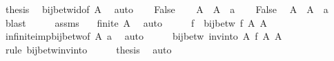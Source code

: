 \begin{isabellebody}
\ {\isacharquery}{\kern0pt}thesis\ \isamarkupfalse%
\ bij{\isacharunderscore}{\kern0pt}betw{\isacharunderscore}{\kern0pt}id{\isacharbrackleft}{\kern0pt}of\ A{\isacharbrackright}{\kern0pt}\ \isamarkupfalse%
\ auto\isanewline
{}\isamarkupfalse%
\isanewline
\ \ \isamarkupfalse%
\ False\isanewline
\ \ \isamarkupfalse%
\ {\isacharquery}{\kern0pt}A{\isacharprime}{\kern0pt}\ {\isacharequal}{\kern0pt}\ {\isachardoublequoteopen}A\ {\isasymunion}\ {\isacharbraceleft}{\kern0pt}a{\isacharbraceright}{\kern0pt}{\isachardoublequoteclose}\isanewline
\ \ \isamarkupfalse%
\ False\ \isamarkupfalse%
\ {\isachardoublequoteopen}A\ {\isacharequal}{\kern0pt}\ {\isacharquery}{\kern0pt}A{\isacharprime}{\kern0pt}\ {\isacharminus}{\kern0pt}\ {\isacharbraceleft}{\kern0pt}a{\isacharbraceright}{\kern0pt}{\isachardoublequoteclose}\ \isamarkupfalse%
\ blast\isanewline
\ \ \isamarkupfalse%
\ \isamarkupfalse%
\ assms\ \isamarkupfalse%
\ {\isachardoublequoteopen}{\isasymnot}\ finite\ {\isacharquery}{\kern0pt}A{\isacharprime}{\kern0pt}{\isachardoublequoteclose}\ \isamarkupfalse%
\ auto\isanewline
\ \ \isamarkupfalse%
\ \isamarkupfalse%
\ f\ \ {\isachardoublequoteopen}bij{\isacharunderscore}{\kern0pt}betw\ f\ {\isacharquery}{\kern0pt}A{\isacharprime}{\kern0pt}\ A{\isachardoublequoteclose}\isanewline
\ \ \ \ \isamarkupfalse%
\ infinite{\isacharunderscore}{\kern0pt}imp{\isacharunderscore}{\kern0pt}bij{\isacharunderscore}{\kern0pt}betw{\isacharbrackleft}{\kern0pt}of\ {\isacharquery}{\kern0pt}A{\isacharprime}{\kern0pt}\ a{\isacharbrackright}{\kern0pt}\ \isamarkupfalse%
\ auto\isanewline
\ \ \isamarkupfalse%
\ \isamarkupfalse%
\ {\isachardoublequoteopen}bij{\isacharunderscore}{\kern0pt}betw\ {\isacharparenleft}{\kern0pt}inv{\isacharunderscore}{\kern0pt}into\ {\isacharquery}{\kern0pt}A{\isacharprime}{\kern0pt}\ f{\isacharparenright}{\kern0pt}\ A\ {\isacharquery}{\kern0pt}A{\isacharprime}{\kern0pt}{\isachardoublequoteclose}\ \isamarkupfalse%
\ {\isacharparenleft}{\kern0pt}rule\ bij{\isacharunderscore}{\kern0pt}betw{\isacharunderscore}{\kern0pt}inv{\isacharunderscore}{\kern0pt}into{\isacharparenright}{\kern0pt}\isanewline
\ \ \isamarkupfalse%
\ \isamarkupfalse%
\ {\isacharquery}{\kern0pt}thesis\ \isamarkupfalse%
\ auto\isanewline

\end{isabellebody}
